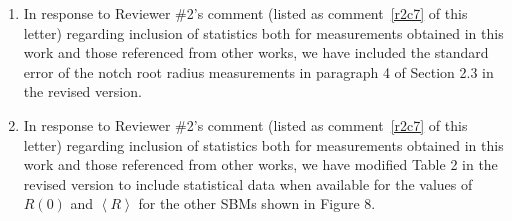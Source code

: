 \documentclass[11pt,letterpaper]{report}
\begin{document}
\begin{enumerate}[label=\textit{Mc.\arabic*}]
%
\item \label{Mc3} In response to Reviewer \#2's comment (listed as comment~\ref{r2c7} of this letter) regarding inclusion of statistics both for measurements obtained in this work and those referenced from other works, we have included the standard error of the notch root radius measurements in paragraph 4 of Section 2.3 in the revised version.
%
\item \label{Mc4} In response to Reviewer \#2's comment (listed as comment~\ref{r2c7} of this letter) regarding inclusion of statistics both for measurements obtained in this work and those referenced from other works, we have modified Table 2 in the revised version to include statistical data when available for the values of $R(0)$ and $\left< R\right>$ for the other SBMs shown in Figure 8.
%
\end{enumerate}
\end{document}
